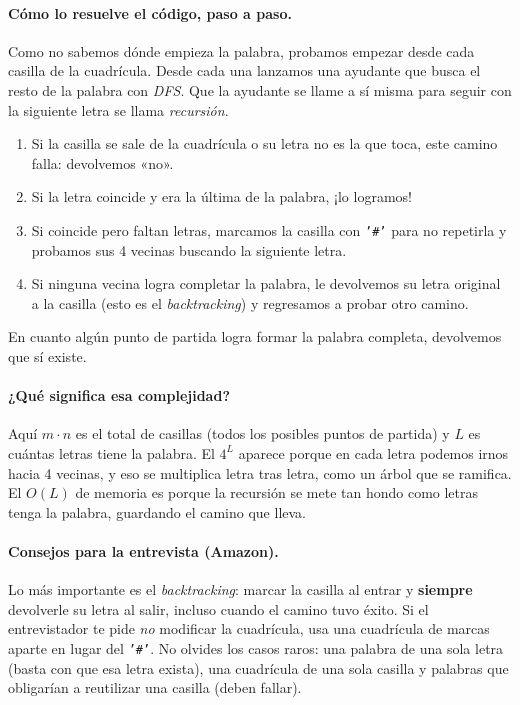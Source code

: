 \paragraph{Cómo lo resuelve el código, paso a paso.} Como no sabemos dónde
empieza la palabra, probamos empezar desde cada casilla de la cuadrícula. Desde cada
una lanzamos una ayudante que busca el resto de la palabra con \emph{DFS}.
Que la ayudante se llame a sí misma para seguir con la siguiente letra
se llama \emph{recursión}.
\begin{enumerate}
  \item Si la casilla se sale de la cuadrícula o su letra no es la que toca, este
        camino falla: devolvemos «no».
  \item Si la letra coincide y era la última de la palabra, ¡lo logramos!
  \item Si coincide pero faltan letras, marcamos la casilla con \texttt{'\#'}
        para no repetirla y probamos sus 4 vecinas buscando la siguiente letra.
  \item Si ninguna vecina logra completar la palabra, le devolvemos su letra
        original a la casilla (esto es el \emph{backtracking}) y regresamos a
        probar otro camino.
\end{enumerate}
En cuanto algún punto de partida logra formar la palabra completa, devolvemos
que sí existe.




\paragraph{¿Qué significa esa complejidad?} Aquí $m\cdot n$ es el total de
casillas (todos los posibles puntos de partida) y $L$ es cuántas letras tiene
la palabra. El $4^{L}$ aparece porque en cada letra podemos irnos hacia 4
vecinas, y eso se multiplica letra tras letra, como un árbol que se ramifica.
El $O(L)$ de memoria es porque la recursión se mete tan hondo como letras tenga
la palabra, guardando el camino que lleva.

\paragraph{Consejos para la entrevista (Amazon).} Lo más importante es el
\emph{backtracking}: marcar la casilla al entrar y \textbf{siempre} devolverle
su letra al salir, incluso cuando el camino tuvo éxito. Si el entrevistador te
pide \emph{no} modificar la cuadrícula, usa una cuadrícula de marcas aparte en lugar
del \texttt{'\#'}. No olvides los casos raros: una palabra de una sola letra
(basta con que esa letra exista), una cuadrícula de una sola casilla y palabras que
obligarían a reutilizar una casilla (deben fallar).
